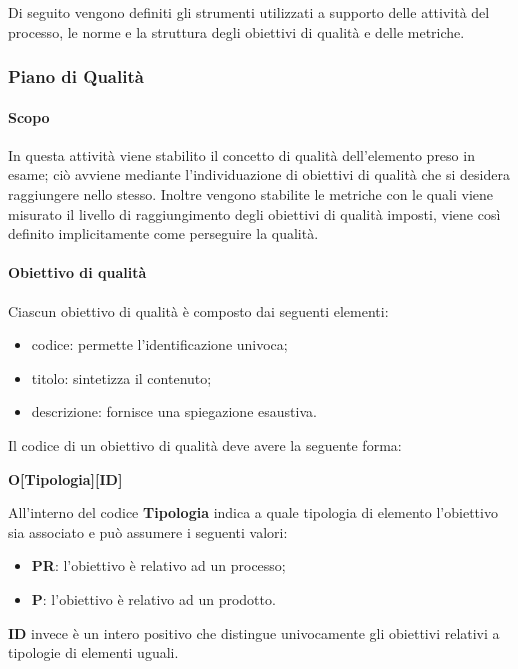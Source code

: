 Di seguito vengono definiti gli strumenti utilizzati a supporto delle attività del processo, le norme e la struttura
degli obiettivi di qualità e delle metriche.

\subsubsection{Piano di Qualità}
\label{ssub:pianificazione_qualita}

\paragraph{Scopo}

In questa attività viene stabilito il concetto di qualità dell'elemento preso in esame; ciò avviene mediante l'individuazione di obiettivi
di qualità che si desidera raggiungere nello stesso. Inoltre vengono stabilite le metriche con le quali viene misurato il livello di
raggiungimento degli obiettivi di qualità imposti, viene così definito implicitamente come perseguire la qualità.

\paragraph{Obiettivo di qualità}
\label{par:obiettivo_qualita}

Ciascun obiettivo di qualità è composto dai seguenti elementi:
\begin{itemize}
	\item codice: permette l'identificazione univoca;
	\item titolo: sintetizza il contenuto;
	\item descrizione: fornisce una spiegazione esaustiva.
\end{itemize}

Il codice di un obiettivo di qualità deve avere la seguente forma:
\begin{center}
	\textbf{O[Tipologia][ID]}
\end{center}
All'interno del codice \textbf{Tipologia} indica a quale tipologia di elemento l'obiettivo sia associato e può assumere i seguenti valori:
\begin{itemize}
	\item \textbf{PR}: l'obiettivo è relativo ad un processo;
	\item \textbf{P}: l'obiettivo è relativo ad un prodotto.
\end{itemize}
\textbf{ID} invece è un intero positivo che distingue univocamente gli obiettivi relativi a tipologie di elementi uguali.

